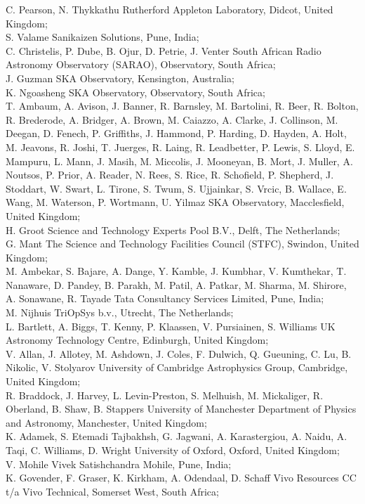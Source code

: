 \documentclass[a4paper,
               biblatex,     %
               keeplastbox,   %
               ]{jacow}
\begin{document}
C. Pearson,
N. Thykkathu Rutherford Appleton Laboratory, Didcot, United Kingdom;\\
S. Valame Sanikaizen Solutions, Pune, India;\\
C. Christelis,
P. Dube,
B. Ojur,
D. Petrie,
J. Venter South African Radio Astronomy Observatory (SARAO), Observatory, South Africa;\\
J. Guzman SKA Observatory, Kensington, Australia;\\
K. Ngoasheng SKA Observatory, Observatory, South Africa;\\
T. Ambaum,
A. Avison,
J. Banner,
R. Barnsley,
M. Bartolini,
R. Beer,
R. Bolton,
R. Brederode,
A. Bridger,
A. Brown,
M. Caiazzo,
A. Clarke,
J. Collinson,
M. Deegan,
D. Fenech,
P. Griffiths,
J. Hammond,
P. Harding,
D. Hayden,
A. Holt,
M. Jeavons,
R. Joshi,
T. Juerges,
R. Laing,
R. Leadbetter,
P. Lewis,
S. Lloyd,
E. Mampuru,
L. Mann,
J. Masih,
M. Miccolis,
J. Mooneyan,
B. Mort,
J. Muller,
A. Noutsos,
P. Prior,
A. Reader,
N. Rees,
S. Rice,
R. Schofield,
P. Shepherd,
J. Stoddart,
W. Swart,
L. Tirone,
S. Twum,
S. Ujjainkar,
S. Vrcic,
B. Wallace,
E. Wang,
M. Waterson,
P. Wortmann,
U. Yilmaz SKA Observatory, Macclesfield, United Kingdom;\\
H. Groot Science and Technology Experts Pool B.V., Delft, The Netherlands;\\
G. Mant The Science and Technology Facilities Council (STFC), Swindon, United Kingdom;\\
M. Ambekar,
S. Bajare,
A. Dange,
Y. Kamble,
J. Kumbhar,
V. Kumthekar,
T. Nanaware,
D. Pandey,
B. Parakh,
M. Patil,
A. Patkar,
M. Sharma,
M. Shirore,
A. Sonawane,
R. Tayade Tata Consultancy Services Limited, Pune, India;\\
M. Nijhuis TriOpSys b.v., Utrecht, The Netherlands;\\
L. Bartlett,
A. Biggs,
T. Kenny,
P. Klaassen,
V. Pursiainen,
S. Williams UK Astronomy Technology Centre, Edinburgh, United Kingdom;\\
V. Allan,
J. Allotey,
M. Ashdown,
J. Coles,
F. Dulwich,
Q. Gueuning,
C. Lu,
B. Nikolic,
V. Stolyarov University of Cambridge Astrophysics Group, Cambridge, United Kingdom;\\
R. Braddock,
J. Harvey,
L. Levin-Preston,
S. Melhuish,
M. Mickaliger,
R. Oberland,
B. Shaw,
B. Stappers University of Manchester Department of Physics and Astronomy, Manchester, United Kingdom;\\
K. Adamek,
S. Etemadi Tajbakhsh,
G. Jagwani,
A. Karastergiou,
A. Naidu,
A. Taqi,
C. Williams,
D. Wright University of Oxford, Oxford, United Kingdom;\\
V. Mohile Vivek Satishchandra Mohile, Pune, India;\\
K. Govender,
F. Graser,
K. Kirkham,
A. Odendaal,
D. Schaff Vivo Resources CC t/a Vivo Technical, Somerset West, South Africa;

\printbibliography
\end{document}
